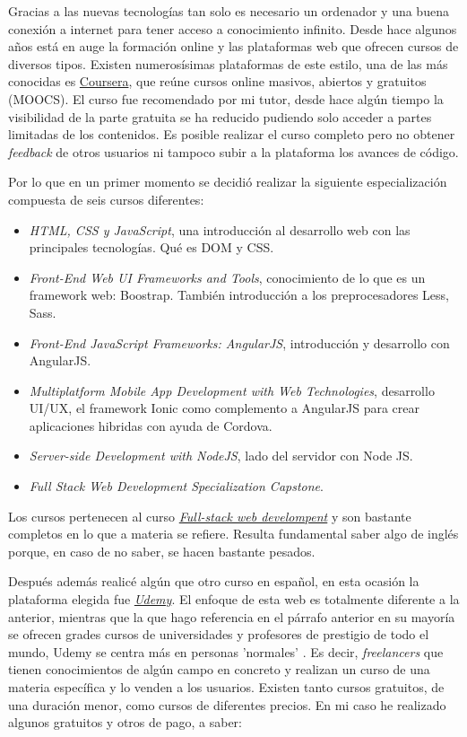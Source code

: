 Gracias a las nuevas tecnologías tan solo es necesario un ordenador y una buena conexión a internet para tener acceso a conocimiento infinito. Desde hace algunos años está en auge la formación online y las plataformas web que ofrecen cursos de diversos tipos. Existen numerosísimas plataformas \cite{elearning} de este estilo, una de las más conocidas es  \href{www.coursera.org}{Coursera}, que reúne cursos online masivos, abiertos y gratuitos (MOOCS). El curso fue recomendado por mi tutor, desde hace algún tiempo la visibilidad de la parte gratuita se ha reducido pudiendo solo acceder a partes limitadas de los contenidos. Es posible realizar el curso completo pero no obtener \emph{feedback} de otros usuarios ni tampoco subir a la plataforma los avances de código.

Por lo que en un primer momento se decidió realizar la siguiente especialización compuesta de seis cursos diferentes:

      
\begin{itemize}
	\item \emph{HTML, CSS y JavaScript}, una introducción al desarrollo web con las principales tecnologías. Qué es DOM y CSS.
	\item  \emph{Front-End Web UI Frameworks and Tools}, conocimiento de lo que es un framework web: Boostrap. También introducción a los preprocesadores Less, Sass.
	\item \emph{Front-End JavaScript Frameworks: AngularJS},  introducción y desarrollo con AngularJS.
	\item  \emph{Multiplatform Mobile App Development with Web Technologies}, desarrollo UI/UX, el framework Ionic como complemento a AngularJS para  crear aplicaciones hibridas con ayuda de Cordova.
	\item  \emph{Server-side Development with NodeJS},  lado del servidor con Node JS.
	\item  \emph{Full Stack Web Development Specialization Capstone}.
\end{itemize}


Los cursos pertenecen al curso \href{https://www.coursera.org/specializations/full-stack}{\emph{Full-stack web develompent}} y son bastante completos en lo que a materia se refiere. Resulta fundamental saber algo de inglés porque, en caso de no saber, se hacen bastante pesados.

Después además realicé algún que otro curso en español, en esta ocasión la plataforma elegida fue  \href{https://www.udemy.com/}{\emph{Udemy}}. El enfoque de esta web es totalmente diferente a la anterior, mientras que la que hago referencia en el párrafo anterior en su mayoría se ofrecen grades cursos de universidades y profesores de prestigio de todo el mundo, Udemy se centra más en personas 'normales' . Es decir, \emph{freelancers}  que tienen conocimientos de algún campo en concreto y realizan un curso de una materia específica y lo venden a los usuarios. Existen tanto cursos gratuitos, de una duración menor, como cursos de diferentes precios. En mi caso he realizado algunos gratuitos y otros de pago, a saber:  

